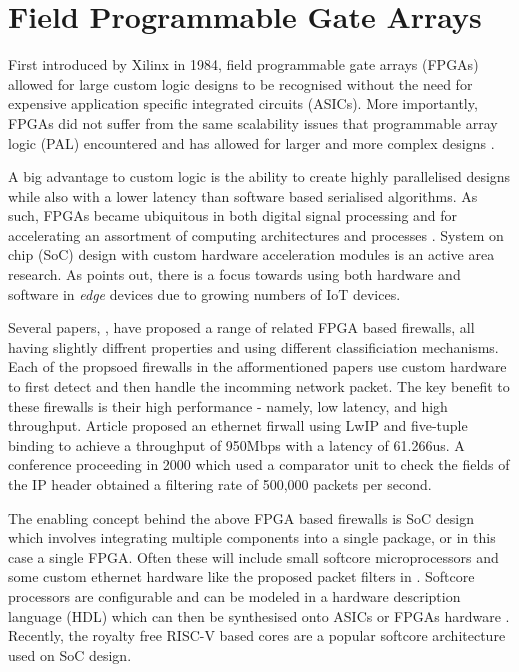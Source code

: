 \section{Field Programmable Gate Arrays}
First introduced by Xilinx in 1984, field programmable gate arrays (FPGAs) allowed for large custom logic designs to be recognised without the need for 
expensive application specific integrated circuits (ASICs). More importantly, FPGAs did not suffer from the same scalability issues that
programmable array logic (PAL) encountered and has allowed for larger and more complex designs \cite{30YearsOfFPGA}. 

A big advantage to custom logic is the ability to create highly parallelised designs while also with a lower latency than software based serialised algorithms. 
As such, FPGAs became ubiquitous in both digital signal processing and for accelerating an assortment of computing architectures and processes \cite{FPGAComputing}.
System on chip (SoC) design with custom hardware acceleration modules is an active area research. As \cite{FPGAComputing} points out, there is a focus towards 
using both hardware and software in \textit{edge} devices due to growing numbers of IoT devices.

Several papers, \cite{LwIPFPGAFirewall} \cite{IPFPGAFirewall2000} \cite{packetFilteringFPGA}, have proposed a range of related FPGA based firewalls, all having 
slightly diffrent properties and using different classificiation mechanisms. Each of the propsoed firewalls in the afformentioned papers use custom hardware 
to first detect and then handle the incomming network packet. The key benefit to these firewalls is their high 
performance - namely, low latency, and high throughput. Article \cite{LwIPFPGAFirewall} proposed an ethernet firwall using LwIP and five-tuple binding 
to achieve a throughput of 950Mbps with a latency of 61.266us. A conference proceeding in 2000 \cite{IPFPGAFirewall2000} which used a comparator unit to check the 
fields of the IP header obtained a filtering rate of 500,000 packets per second. 

The enabling concept behind the above FPGA based firewalls is SoC design which involves integrating multiple components into a single package, or in this case a 
single FPGA. Often these will include small softcore microprocessors and some custom ethernet hardware like the proposed packet filters in \cite{LwIPFPGAFirewall}.
Softcore processors are configurable and can be modeled in a hardware description language (HDL) which can then be synthesised onto ASICs or FPGAs hardware 
\cite{SoftcoreBasedEmbeddedSystems}. Recently, the royalty free RISC-V based cores are a popular softcore architecture used on SoC design.


